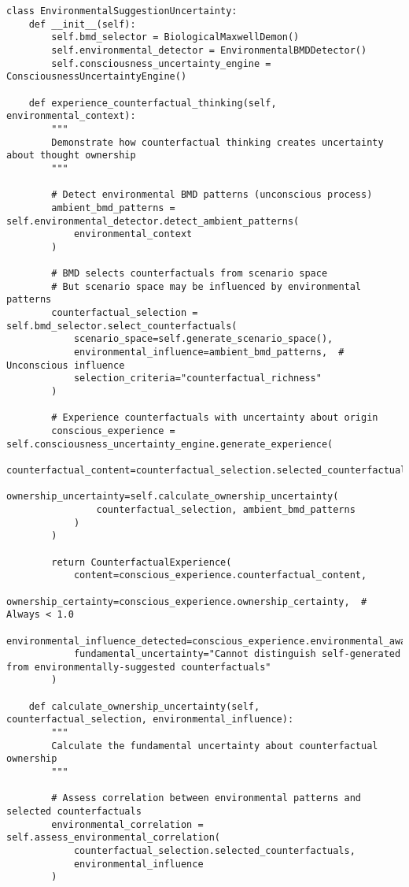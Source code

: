 \documentclass[12pt,a4paper]{article}
\begin{document}
\begin{lstlisting}[style=pythonstyle, caption=Environmental Suggestion Uncertainty Implementation]
class EnvironmentalSuggestionUncertainty:
    def __init__(self):
        self.bmd_selector = BiologicalMaxwellDemon()
        self.environmental_detector = EnvironmentalBMDDetector()
        self.consciousness_uncertainty_engine = ConsciousnessUncertaintyEngine()
        
    def experience_counterfactual_thinking(self, environmental_context):
        """
        Demonstrate how counterfactual thinking creates uncertainty about thought ownership
        """
        
        # Detect environmental BMD patterns (unconscious process)
        ambient_bmd_patterns = self.environmental_detector.detect_ambient_patterns(
            environmental_context
        )
        
        # BMD selects counterfactuals from scenario space
        # But scenario space may be influenced by environmental patterns
        counterfactual_selection = self.bmd_selector.select_counterfactuals(
            scenario_space=self.generate_scenario_space(),
            environmental_influence=ambient_bmd_patterns,  # Unconscious influence
            selection_criteria="counterfactual_richness"
        )
        
        # Experience counterfactuals with uncertainty about origin
        conscious_experience = self.consciousness_uncertainty_engine.generate_experience(
            counterfactual_content=counterfactual_selection.selected_counterfactuals,
            ownership_uncertainty=self.calculate_ownership_uncertainty(
                counterfactual_selection, ambient_bmd_patterns
            )
        )
        
        return CounterfactualExperience(
            content=conscious_experience.counterfactual_content,
            ownership_certainty=conscious_experience.ownership_certainty,  # Always < 1.0
            environmental_influence_detected=conscious_experience.environmental_awareness,
            fundamental_uncertainty="Cannot distinguish self-generated from environmentally-suggested counterfactuals"
        )
    
    def calculate_ownership_uncertainty(self, counterfactual_selection, environmental_influence):
        """
        Calculate the fundamental uncertainty about counterfactual ownership
        """
        
        # Assess correlation between environmental patterns and selected counterfactuals
        environmental_correlation = self.assess_environmental_correlation(
            counterfactual_selection.selected_counterfactuals,
            environmental_influence
        )
        

\end{lstlisting}
\end{document}
